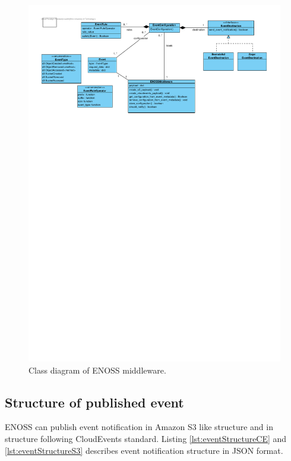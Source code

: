     \begin{figure}[H]
        \centering
        \includegraphics[angle=90,height=1\textheight]{obrazky-figures/enoss_class_diagram.pdf}
        \caption{Class diagram of ENOSS middleware.}
        \label{fig:middlewareClassDiagram}
    \end{figure}


    \subsection{Structure of published event}
    ENOSS can publish event notification in Amazon S3 like structure and in structure following CloudEvents standard. Listing \ref{lst:eventStructureCE} and \ref{lst:eventStructureS3} describes event notification structure in JSON format.

